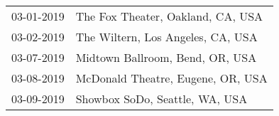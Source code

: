 \begin{supertabular}{ll}
 03-01-2019 &  The Fox Theater, Oakland, CA, USA \\
 03-02-2019 &  The Wiltern, Los Angeles, CA, USA \\
 03-07-2019 &    Midtown Ballroom, Bend, OR, USA \\
 03-08-2019 &  McDonald Theatre, Eugene, OR, USA \\
 03-09-2019 &     Showbox SoDo, Seattle, WA, USA \\
\end{supertabular}
